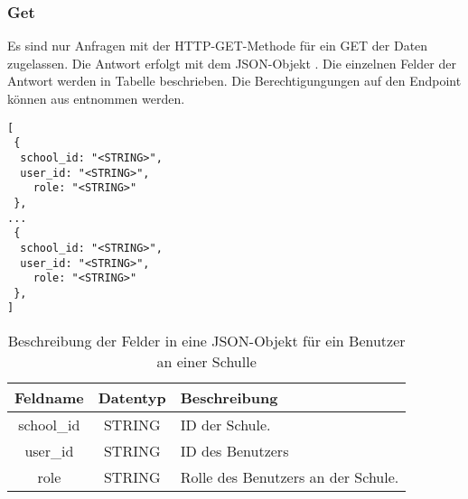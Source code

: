 \subsubsection{Get}
\label{sec:end:rest:api:school:users:read}
Es sind nur Anfragen mit der HTTP-GET-Methode für ein GET der Daten zugelassen.
Die Antwort erfolgt mit dem JSON-Objekt . Die einzelnen Felder der Antwort werden in Tabelle  beschrieben.
Die Berechtigungungen auf den Endpoint können aus  entnommen werden.

\begin{lstlisting}[caption={JSON-Antwort für einen GET-Aufruf der Route /api/school/users},label={lst:code:end:rest:api:school:users:read:ret},frame=tlrb]
[
 {
  school_id: "<STRING>",
  user_id: "<STRING>",
	role: "<STRING>"
 },
...
 {
  school_id: "<STRING>",
  user_id: "<STRING>",
	role: "<STRING>"
 },
]
\end{lstlisting}

\begin{table}[htb]
	\begin{tabularx}{\textwidth}{|c|c|X|}
		\hline
			\textbf{Feldname} & \textbf{Datentyp} & \textbf{Beschreibung} \\ \hline
			school\_id & STRING & ID der Schule. \\ \hline
			user\_id & STRING & ID des Benutzers \\ \hline
			role & STRING & Rolle des Benutzers an der Schule. \\ \hline
	\end{tabularx}

		\caption{Beschreibung der Felder in eine JSON-Objekt für ein Benutzer an einer Schulle}
		\label{tab:end:rest:api:school:users:read:ret:json}
\end{table}

